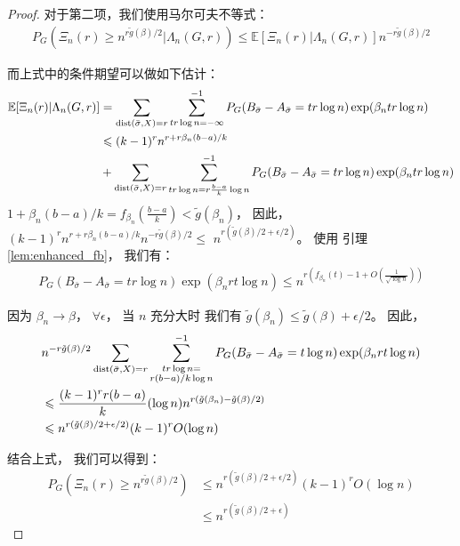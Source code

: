 \begin{proof}
  对于第二项，我们使用马尔可夫不等式：
  \begin{align*}
  P_G\left(\Xi_n(r) \geq n^{r \tilde{g}(\beta) /2} |\Lambda_n(G,r) \right)
  \leq \mathbb{E}[\Xi_n(r)|\Lambda_n(G,r)]n^{-r \tilde{g}(\beta) /2} 
  \end{align*}
  
  而上式中的条件期望可以做如下估计：
  \begin{align*}
  \mathbb{E}[\Xi_n(r)|\Lambda_n(G,r)]&=
  \sum_{\operatorname{dist}(\bar{\sigma}, X) = r}\sum_{tr\log n = -\infty }^{-1} 
   P_G(B_{\bar{\sigma}} -A_{\bar{\sigma}}=tr\log n)\exp(\beta_n tr \log n) \\
  & \leqslant (k-1)^r n^{r+r\beta_n(b-a)/k} \\
  &\relax +
  \sum_{\operatorname{dist}(\bar{\sigma}, X) = r}\sum_{tr\log n = r\frac{b-a}{k}\log n }^{-1} 
   P_G(B_{\bar{\sigma}} -A_{\bar{\sigma}}=tr\log n)\exp(\beta_n tr \log n)
  \end{align*}
  $1+\beta_n(b-a)/k = f_{\beta_n}(\frac{b-a}{k}) < \tilde{g}(\beta_n)$，
  因此，
  $(k-1)^r n^{r+r\beta_n (b-a)/k}n^{-r \tilde{g}(\beta) /2} \leq$
   $n^{r (\tilde{g}(\beta) /2 + \epsilon/2)} $。
  使用 引理 \ref{lem:enhanced_fb}， 我们有：
  \begin{align*}
  P_G(B_{\bar{\sigma}} -A_{\bar{\sigma}}=tr\log n)\exp(\beta_n rt \log n) \leq 
  n^{r(f_{\beta_n}(t)-1 + O(\frac{1}{\sqrt{\log n}}))}
  \end{align*}
  
  因为 $\beta_n \to \beta$， $\forall \epsilon$，
  当 $n$ 充分大时
  我们有 $\tilde{g}(\beta_n) \leq \tilde{g}(\beta) + \epsilon /2$。
  因此，
  \begin{align*}
  &n^{-r \tilde{g}(\beta) /2}\sum_{\operatorname{dist}(\bar{\sigma}, X) = r}\sum_{\substack{tr\log n = \\ r(b-a)/k\log n} }^{-1}
  P_G(B_{\bar{\sigma}} -A_{\bar{\sigma}}=t\log n)\exp(\beta_n rt \log n) \\
  & \leqslant  \frac{(k-1)^r r(b-a)}{k} ( \log n )
  n^{r(\tilde{g}(\beta_n) - \tilde{g}(\beta)/2)}\\
  & \leqslant  n^{r(\tilde{g}(\beta)/2 + \epsilon/2)}  (k-1)^r O(\log n)
  \end{align*}
  
  结合上式， 我们可以得到：
  \begin{align*}
  P_{G}(\Xi_n(r) \geq n^{r \tilde{g}(\beta) /2}) &\leq  n^{r(\tilde{g}(\beta)/2 + \epsilon/2)}  (k-1)^r O(\log n)\\
  &\leq n^{r(\tilde{g}(\beta)/2 + \epsilon)}
  \end{align*}
  

\end{proof}
